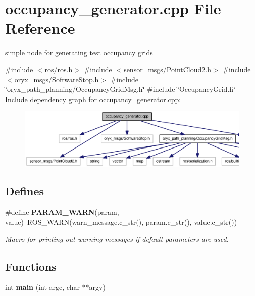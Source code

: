 \section{occupancy\-\_\-generator.\-cpp \-File \-Reference}
\label{occupancy__generator_8cpp}


simple node for generating test occupancy grids  


{\ttfamily \#include $<$ros/ros.\-h$>$}\*
{\ttfamily \#include $<$sensor\-\_\-msgs/\-Point\-Cloud2.\-h$>$}\*
{\ttfamily \#include $<$oryx\-\_\-msgs/\-Software\-Stop.\-h$>$}\*
{\ttfamily \#include \char`\"{}oryx\-\_\-path\-\_\-planning/\-Occupancy\-Grid\-Msg.\-h\char`\"{}}\*
{\ttfamily \#include \char`\"{}\-Occupancy\-Grid.\-h\char`\"{}}\*
\-Include dependency graph for occupancy\-\_\-generator.\-cpp\-:
\nopagebreak
\begin{figure}[H]
\begin{center}
\leavevmode
\includegraphics[width=350pt]{occupancy__generator_8cpp__incl}
\end{center}
\end{figure}
\subsection*{\-Defines}
\begin{DoxyCompactItemize}
\item 
\#define {\bf \-P\-A\-R\-A\-M\-\_\-\-W\-A\-R\-N}(param, value)~\-R\-O\-S\-\_\-\-W\-A\-R\-N(warn\-\_\-message.\-c\-\_\-str(), param.\-c\-\_\-str(), value.\-c\-\_\-str())
\begin{DoxyCompactList}\small\item\em \-Macro for printing out warning messages if default parameters are used. \end{DoxyCompactList}\end{DoxyCompactItemize}
\subsection*{\-Functions}
\begin{DoxyCompactItemize}
\item 
int {\bf main} (int argc, char $\ast$$\ast$argv)
\end{DoxyCompactItemize}


